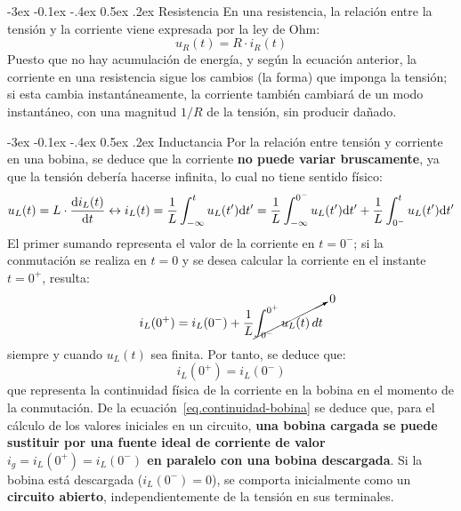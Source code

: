 \documentclass[11pt]{book} %
\makeatletter
\numberwithin{dummy}{section}
\theoremstyle{ocrenumbox}
\theoremstyle{blacknumex}
\theoremstyle{blacknumbox}
\theoremstyle{ocrenum}
\renewcommand{\subsection}{\@startsection {subsection}{2}{\z@}
{-3ex \@plus -0.1ex \@minus -.4ex}
{0.5ex \@plus.2ex }
{\normalfont\sffamily\bfseries}}
\makeatother
\begin{document}
	\subsection{Resistencia}
	En una resistencia, la relación entre la tensión y la corriente viene expresada por la ley de Ohm:
	\begin{equation*}
		u_R(t)=R\cdot i_R(t)
	\end{equation*}
	Puesto que no hay acumulación de energía, y según la ecuación anterior, la corriente en una resistencia sigue los cambios (la forma) que imponga la tensión; si esta cambia instantáneamente, la corriente también cambiará de un modo instantáneo, con una magnitud $1/R$ de la tensión, sin producir dañado. 
	
	\subsection{Inductancia}
	Por la relación entre tensión y corriente en una bobina, se deduce que la corriente \textbf{no puede variar bruscamente}, ya que la tensión debería hacerse infinita, lo cual no tiene sentido físico:
	\begin{equation*}
		u_L(t) = L \cdot \diff{i_L(t)}{t}
\leftrightarrow
i_L(t) = \frac{1}{L} \int^t_{-\infty}u_L(t') \mathrm{d}t'= \frac{1}{L} \int^{0^-}_{-\infty}u_L(t')\mathrm{d}t' + \frac{1}{L} \int^{t}_{0^-}u_L(t')\mathrm{d}t'
	\end{equation*}
	El primer sumando representa el valor de la corriente en $t=0^-$; si la conmutación se realiza en $t=0$ y se desea calcular la corriente en el instante $t=0^+$, resulta:
	\begin{equation*}
		i_L(0^+)=i_L(0^-)+ \dfrac{1}{L}\cancelto{0}{\int_{0^-}^{0^+} u_L(t)\, dt}
	\end{equation*}
	siempre y cuando $u_L(t)$ sea finita. Por tanto, se deduce que:
	\begin{equation}\label{eq.continuidad-bobina}
		\boxed{i_L(0^+)=i_L(0^-)}
	\end{equation}
	que representa la continuidad física de la corriente en la bobina en el momento de la conmutación. De la ecuación~\eqref{eq.continuidad-bobina} se deduce que, para el cálculo de los valores iniciales en un circuito, \textbf{una bobina cargada se puede sustituir por una fuente ideal de corriente de valor $i_g=i_L(0^+)=i_L(0^-)$ en paralelo con una bobina descargada}. Si la bobina está descargada ($i_L(0^-)=0$), se comporta inicialmente como un \textbf{circuito abierto}, independientemente de la tensión en sus terminales.
	
\end{document}
